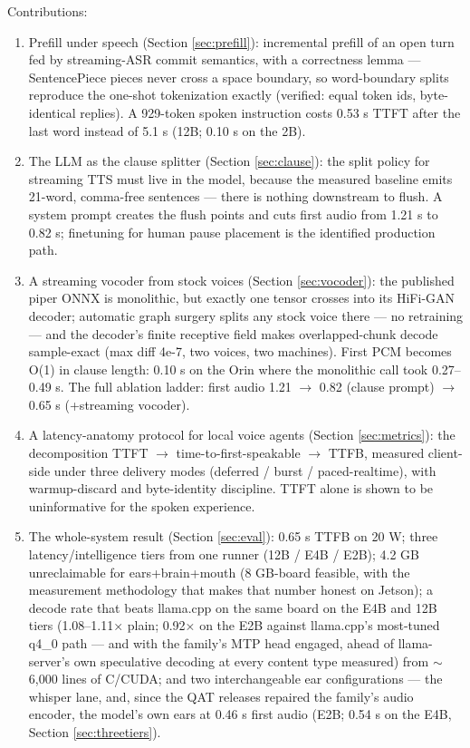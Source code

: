 \documentclass{article}
\begin{document}
Contributions:

\begin{enumerate}
	\item Prefill under speech (Section \ref{sec:prefill}): incremental prefill of an open turn fed by streaming-ASR commit semantics, with a correctness lemma --- SentencePiece pieces never cross a space boundary, so word-boundary splits reproduce the one-shot tokenization exactly (verified: equal token ids, byte-identical replies). A 929-token spoken instruction costs 0.53 s TTFT after the last word instead of 5.1 s (12B; 0.10 s on the 2B).
	\item The LLM as the clause splitter (Section \ref{sec:clause}): the split policy for streaming TTS must live in the model, because the measured baseline emits 21-word, comma-free sentences --- there is nothing downstream to flush. A system prompt creates the flush points and cuts first audio from 1.21 s to 0.82 s; finetuning for human pause placement is the identified production path.
	\item A streaming vocoder from stock voices (Section \ref{sec:vocoder}): the published piper ONNX is monolithic, but exactly one tensor crosses into its HiFi-GAN decoder; automatic graph surgery splits any stock voice there --- no retraining --- and the decoder's finite receptive field makes overlapped-chunk decode sample-exact (max diff 4e-7, two voices, two machines). First PCM becomes O(1) in clause length: 0.10 s on the Orin where the monolithic call took 0.27--0.49 s. The full ablation ladder: first audio 1.21 $\rightarrow$ 0.82 (clause prompt) $\rightarrow$ 0.65 s (+streaming vocoder).
	\item A latency-anatomy protocol for local voice agents (Section \ref{sec:metrics}): the decomposition TTFT $\rightarrow$ time-to-first-speakable $\rightarrow$ TTFB, measured client-side under three delivery modes (deferred / burst / paced-realtime), with warmup-discard and byte-identity discipline. TTFT alone is shown to be uninformative for the spoken experience.
	\item The whole-system result (Section \ref{sec:eval}): 0.65 s TTFB on 20 W; three latency/intelligence tiers from one runner (12B / E4B / E2B); 4.2 GB unreclaimable for ears+brain+mouth (8 GB-board feasible, with the measurement methodology that makes that number honest on Jetson); a decode rate that beats llama.cpp on the same board on the E4B and 12B tiers (1.08--1.11× plain; 0.92× on the E2B against llama.cpp's most-tuned q4\_0 path --- and with the family's MTP head engaged, ahead of llama-server's own speculative decoding at every content type measured) from $\sim$6,000 lines of C/CUDA; and two interchangeable ear configurations --- the whisper lane, and, since the QAT releases repaired the family's audio encoder, the model's own ears at 0.46 s first audio (E2B; 0.54 s on the E4B, Section \ref{sec:threetiers}).

\end{enumerate}
\end{document}
